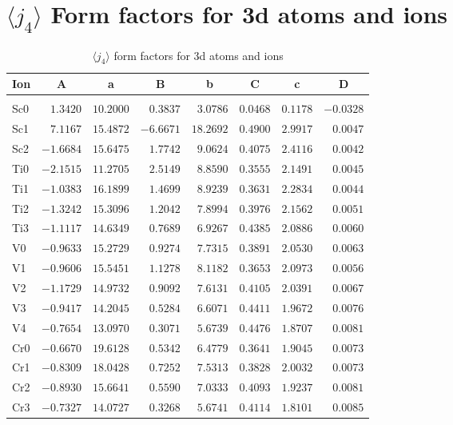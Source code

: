 \section{{\large$\langle j_4\rangle$} Form factors for 3d atoms and ions}
\begin{table}[H]
\caption{$\langle j_4\rangle$ form factors for 3d atoms and ions}\vspace{2mm}
\label{3dj4}
{\tablesize
\begin{tabular}{lrrrrrrr}
\hline
Ion&
\multicolumn{1}{c}{A}&\multicolumn{1}{c}{a}&
\multicolumn{1}{c}{B}&\multicolumn{1}{c}{b}&
\multicolumn{1}{c}{C}&\multicolumn{1}{c}{c}&\multicolumn{1}{c}{D}\\
\hline\\[-2ex]
Sc0 &$1.3420$ &$10.2000$ &$0.3837$ &$3.0786$ &$0.0468$ &$0.1178$ &$-0.0328$ \\
Sc1 &$7.1167$ &$15.4872$ &$-6.6671$ &$18.2692$ &$0.4900$ &$2.9917$ &$0.0047$ \\
Sc2 &$-1.6684$ &$15.6475$ &$1.7742$ &$9.0624$ &$0.4075$ &$2.4116$ &$0.0042$ \\
Ti0 &$-2.1515$ &$11.2705$ &$2.5149$ &$8.8590$ &$0.3555$ &$2.1491$ &$0.0045$ \\
Ti1 &$-1.0383$ &$16.1899$ &$1.4699$ &$8.9239$ &$0.3631$ &$2.2834$ &$0.0044$ \\
Ti2 &$-1.3242$ &$15.3096$ &$1.2042$ &$7.8994$ &$0.3976$ &$2.1562$ &$0.0051$ \\
Ti3 &$-1.1117$ &$14.6349$ &$0.7689$ &$6.9267$ &$0.4385$ &$2.0886$ &$0.0060$ \\
V0 &$-0.9633$ &$15.2729$ &$0.9274$ &$7.7315$ &$0.3891$ &$2.0530$ &$0.0063$ \\
V1 &$-0.9606$ &$15.5451$ &$1.1278$ &$8.1182$ &$0.3653$ &$2.0973$ &$0.0056$ \\
V2 &$-1.1729$ &$14.9732$ &$0.9092$ &$7.6131$ &$0.4105$ &$2.0391$ &$0.0067$ \\
V3 &$-0.9417$ &$14.2045$ &$0.5284$ &$6.6071$ &$0.4411$ &$1.9672$ &$0.0076$ \\
V4 &$-0.7654$ &$13.0970$ &$0.3071$ &$5.6739$ &$0.4476$ &$1.8707$ &$0.0081$ \\
Cr0 &$-0.6670$ &$19.6128$ &$0.5342$ &$6.4779$ &$0.3641$ &$1.9045$ &$0.0073$ \\
Cr1 &$-0.8309$ &$18.0428$ &$0.7252$ &$7.5313$ &$0.3828$ &$2.0032$ &$0.0073$ \\
Cr2 &$-0.8930$ &$15.6641$ &$0.5590$ &$7.0333$ &$0.4093$ &$1.9237$ &$0.0081$ \\
Cr3 &$-0.7327$ &$14.0727$ &$0.3268$ &$5.6741$ &$0.4114$ &$1.8101$ &$0.0085$ \\

\end{tabular}}
\end{table}
